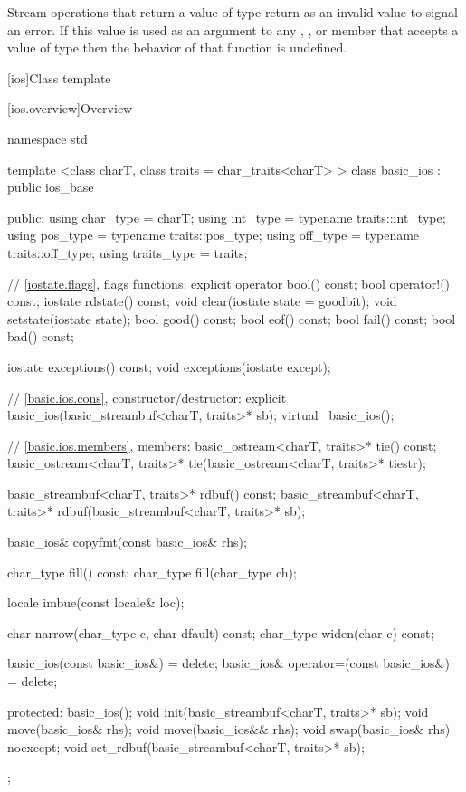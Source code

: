 \pnum
Stream operations that return a value of type
return
as an invalid value to signal an error.
If this value is used as an argument to any
,
,
or
 member
that accepts a value of type
then the behavior of that function is undefined.
%

[ios]{Class template }

[ios.overview]{Overview}

%
\begin{codeblock}
namespace std {
  template <class charT, class traits = char_traits<charT> >
  class basic_ios : public ios_base {
  public:
    using char_type   = charT;
    using int_type    = typename traits::int_type;
    using pos_type    = typename traits::pos_type;
    using off_type    = typename traits::off_type;
    using traits_type = traits;

    // \ref{iostate.flags}, flags functions:
    explicit operator bool() const;
    bool operator!() const;
    iostate rdstate() const;
    void clear(iostate state = goodbit);
    void setstate(iostate state);
    bool good() const;
    bool eof()  const;
    bool fail() const;
    bool bad()  const;

    iostate exceptions() const;
    void exceptions(iostate except);

    // \ref{basic.ios.cons}, constructor/destructor:
    explicit basic_ios(basic_streambuf<charT, traits>* sb);
    virtual ~basic_ios();

    // \ref{basic.ios.members}, members:
    basic_ostream<charT, traits>* tie() const;
    basic_ostream<charT, traits>* tie(basic_ostream<charT, traits>* tiestr);

    basic_streambuf<charT, traits>* rdbuf() const;
    basic_streambuf<charT, traits>* rdbuf(basic_streambuf<charT, traits>* sb);

    basic_ios& copyfmt(const basic_ios& rhs);

    char_type fill() const;
    char_type fill(char_type ch);

    locale imbue(const locale& loc);

    char      narrow(char_type c, char dfault) const;
    char_type widen(char c) const;

    basic_ios(const basic_ios&) = delete;
    basic_ios& operator=(const basic_ios&) = delete;

  protected:
    basic_ios();
    void init(basic_streambuf<charT, traits>* sb);
    void move(basic_ios& rhs);
    void move(basic_ios&& rhs);
    void swap(basic_ios& rhs) noexcept;
    void set_rdbuf(basic_streambuf<charT, traits>* sb);

  };
}
\end{codeblock}

